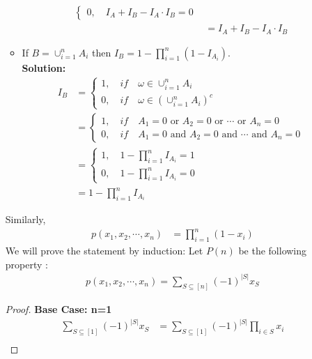 \documentclass{article}
\begin{document}
\begin{enumerate}
\begin{itemize}
\begin{align*}
\begin{cases}
                 0, \quad  I_A+I_B-I_A \cdot I_B=0
             \end{cases}\\
             &= I_A+I_B-I_A \cdot I_B
         \end{align*}
        \item If $B = \cup_{i=1}^{n} A_i$ then $I_B = 1-\prod_{i=1}^{n}(1-I_{A_i})$.
        \\
        \textbf{Solution:}
        \begin{align*}
            I_B &=
                \begin{cases}
                    1, \quad if \quad \omega \in \cup_{i=1}^{n}A_i\\
                    0, \quad if \quad \omega \in (\cup_{i=1}^{n}A_i)^c
                \end{cases}\\
                &=\begin{cases}
                    1, \quad if \quad A_1=0 \text{ or } A_2=0 \text{ or } \cdots \text{ or }A_n=0\\
                    0, \quad if \quad  A_1=0 \text{ and } A_2=0 \text{ and } \cdots \text{ and  }A_n=0
                \end{cases}\\
                &= \begin{cases}
                    1, \quad 1-\prod_{i=1}^{n}I_{A_i}=1\\
                    0, \quad 1-\prod_{i=1}^{n}I_{A_i}=0
                \end{cases}\\
                &= 1-\prod_{i=1}^{n}I_{A_i}
        \end{align*}
    \end{itemize}
    Similarly, 
    \begin{align*}
        p(x_1,x_2, \cdots , x_n)&= \prod_{i=1}^{n}(1-x_i)
    \end{align*}
    We will prove the statement by induction:
    Let $P(n)$ be the following property :
    \begin{align*}
        p(x_1,x_2,\cdots,x_n)=\sum_{S \subseteq [n]}(-1)^{|S|}x_{S}
    \end{align*}
    \begin{proof}
        \textbf{Base Case: n=1}
        \begin{align*}
            \sum_{S \subseteq [1]}(-1)^{|S|}x_{S}
            &=\sum_{S \subseteq [1]}(-1)^{|S|}\prod_{i \in S}x_{i}\\

\end{align*}
\end{proof}
\end{enumerate}
\end{document}
